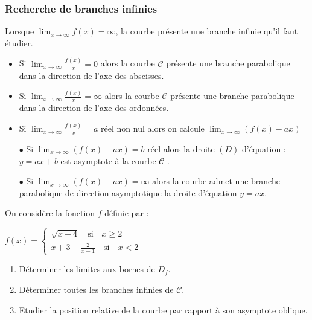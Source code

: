 \subsubsection{Recherche de branches infinies}
Lorsque  $\lim_{x \to \infty}f(x)=\infty  $, la courbe présente une branche infinie qu'il faut étudier.
\begin{itemize}
\item    Si $\displaystyle \lim_{x \to \infty}\frac{f(x)}{x}=0  $  alors la courbe $ \mathcal{C} $ présente une branche parabolique dans la direction  de  l'axe des abscisses.
\item    Si $\displaystyle \lim_{x \to \infty}\frac{f(x)}{x}=\infty$  alors la courbe $ \mathcal{C} $ présente une branche parabolique dans la direction  de  l'axe des ordonnées.
\item  Si  $\lim_{x \to \infty}\frac{f(x)}{x}=a  $  réel  non nul alors on calcule $\lim_{x \to \infty}(f(x)-ax )  $ 

 $ \bullet $ Si  $\displaystyle \lim_{x \to \infty}(f(x)-ax) = b $  réel alors la droite $(D)$ d'équation : $y = a x  + b $ est asymptote à la courbe $ \mathcal{C} $ .

 $ \bullet $ Si $\displaystyle \lim_{x \to \infty}(f(x)-ax) = \infty $     alors la courbe admet une branche parabolique de direction asymptotique la droite d'équation $ y =  a x $.
\end{itemize}
\begin{exercice}
On considère la fonction $ f $ définie par :

$ f (x)=\left\{\begin{array}{l} \sqrt{x +4}\quad \text{si} \quad x\geq 2 \\ x+3-\frac{2}{x-1}\quad \text{si}\quad x< 2  \end{array} \right.$

\begin{enumerate}
\item Déterminer  les limites aux bornes de $ D_{f} $.
\item Déterminer toutes les branches infinies de $ \mathcal{C} $.
\item Etudier la position relative de la courbe par rapport à son asymptote oblique.
\end{enumerate}
\end{exercice}

